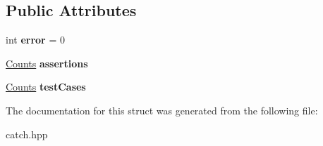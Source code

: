 \subsection*{Public Attributes}
\begin{DoxyCompactItemize}
\item 
int {\bfseries error} = 0\hypertarget{structCatch_1_1Totals_a6ea14c7de7ea735a14f172a26e08a239}{}\label{structCatch_1_1Totals_a6ea14c7de7ea735a14f172a26e08a239}

\item 
\hyperlink{structCatch_1_1Counts}{Counts} {\bfseries assertions}\hypertarget{structCatch_1_1Totals_a885ded66df752147b30c3d45aa602ec9}{}\label{structCatch_1_1Totals_a885ded66df752147b30c3d45aa602ec9}

\item 
\hyperlink{structCatch_1_1Counts}{Counts} {\bfseries test\+Cases}\hypertarget{structCatch_1_1Totals_adb195fe477aedee2ecea88c888f16506}{}\label{structCatch_1_1Totals_adb195fe477aedee2ecea88c888f16506}

\end{DoxyCompactItemize}


The documentation for this struct was generated from the following file\+:\begin{DoxyCompactItemize}
\item 
catch.\+hpp\end{DoxyCompactItemize}
